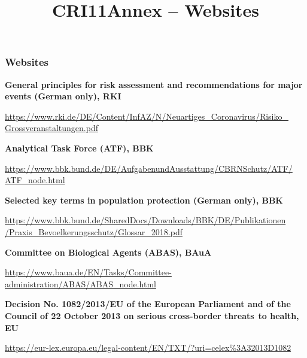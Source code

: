 \documentclass{article}
\begin{document}
\title{CRI11Annex – Websites}

\maketitle


\subsubsection{Websites}\label{H8354250}



\textbf{General principles for risk assessment and recommendations for major events (German only), RKI}


\href{https://www.rki.de/DE/Content/InfAZ/N/Neuartiges_Coronavirus/Risiko_Grossveranstaltungen.pdf?__blob=publicationFile}{https://www.rki.de/DE/Content/InfAZ/N/Neuartiges\_Coronavirus/Risiko\_} \href{https://www.rki.de/DE/Content/InfAZ/N/Neuartiges_Coronavirus/Risiko_Grossveranstaltungen.pdf?__blob=publicationFile}{Grossveranstaltungen.pdf}


\textbf{Analytical Task Force (ATF), BBK}


\href{https://www.bbk.bund.de/DE/AufgabenundAusstattung/CBRNSchutz/ATF/ATF_node.html}{https://www.bbk.bund.de/DE/AufgabenundAusstattung/CBRNSchutz/ATF/} \href{https://www.bbk.bund.de/DE/AufgabenundAusstattung/CBRNSchutz/ATF/ATF_node.html}{ATF\_node.html}


\textbf{Selected key terms in population protection (German only), BBK}


\href{https://www.bbk.bund.de/SharedDocs/Downloads/BBK/DE/Publikationen/Praxis_Bevoelkerungsschutz/Glossar_2018.pdf}{https://www.bbk.bund.de/SharedDocs/Downloads/BBK/DE/Publikationen} \href{https://www.bbk.bund.de/SharedDocs/Downloads/BBK/DE/Publikationen/Praxis_Bevoelkerungsschutz/Glossar_2018.pdf}{/Praxis\_Bevoelkerungsschutz/Glossar\_2018.pdf}


\textbf{Committee on Biological Agents (ABAS), BAuA}


\href{https://www.baua.de/EN/Tasks/Committee-administration/ABAS/ABAS_node.html}{https://www.baua.de/EN/Tasks/Committee-administration/ABAS/ABAS\_node.html}


\textbf{Decision No. 1082/2013/EU of the European Parliament and of the Council of 22 October 2013 on serious cross-border threats} \textbf{to health, EU }


\href{https://eur-lex.europa.eu/legal-content/EN/TXT/?uri=celex%3A32013D1082}{https://eur-lex.europa.eu/legal-content/EN/TXT/?uri=celex\%3A32013D1082}
\end{document}
